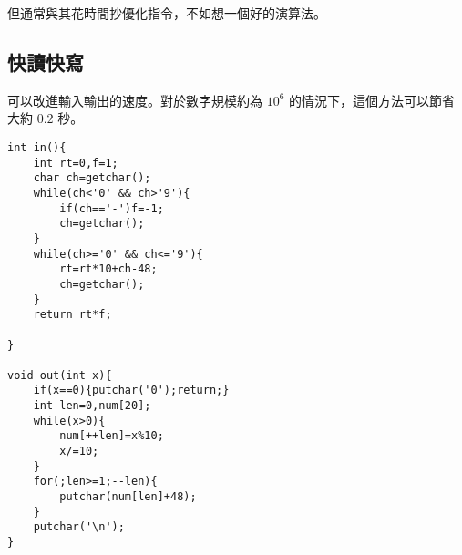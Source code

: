     \begin{tip}
        但通常與其花時間抄優化指令，不如想一個好的演算法。
    \end{tip}

    \subsection{快讀快寫}
    可以改進輸入輸出的速度。對於數字規模約為 $10^6$ 的情況下，這個方法可以節省大約 $0.2$ 秒。 

    \begin{lstlisting}[caption=快速讀寫]
int in(){
    int rt=0,f=1;
    char ch=getchar();
    while(ch<'0' && ch>'9'){
        if(ch=='-')f=-1;
        ch=getchar();
    }
    while(ch>='0' && ch<='9'){
        rt=rt*10+ch-48;
        ch=getchar();
    }
    return rt*f;

}

void out(int x){
    if(x==0){putchar('0');return;}
    int len=0,num[20];
    while(x>0){
        num[++len]=x%10;
        x/=10;
    }
    for(;len>=1;--len){
        putchar(num[len]+48);
    }
    putchar('\n');
}\end{lstlisting}